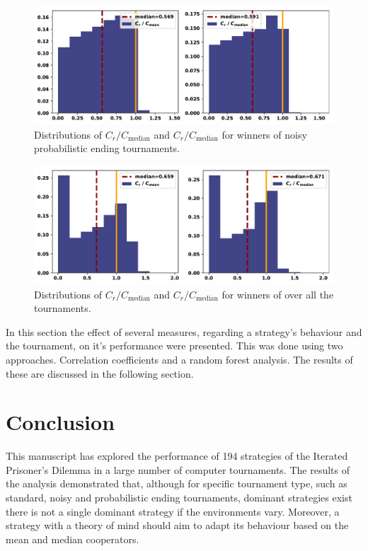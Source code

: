 \documentclass{article}
\begin{document}
\begin{figure}[!htbp]
    \centering
    \includegraphics[width=.5\textwidth]{../images/compared_to_mean_median_probend_noisy.pdf}
    \caption{Distributions of \(C_r / C_{\text{median}}\)
    and \(C_r / C_{\text{median}}\) for winners of noisy probabilistic ending tournaments.}\label{fig:mean_median_probend_noisy}
\end{figure}

\begin{figure}[!htbp]
    \centering
    \includegraphics[width=.5\textwidth]{../images/compared_to_mean_median_overall.pdf}
    \caption{Distributions of \(C_r / C_{\text{median}}\)
    and \(C_r / C_{\text{median}}\) for winners of over all the tournaments.}\label{fig:mean_median_overall}
\end{figure}

In this section the effect of several measures, regarding a strategy's behaviour
and the tournament, on it's performance were presented. This was done using
two approaches. Correlation coefficients and a random forest
analysis. The results of these are discussed in the following section.

\section{Conclusion}\label{section:conclusion}

This manuscript has explored the performance of 194 strategies of the Iterated
Prisoner's Dilemma in a large number of computer tournaments. The results of
the analysis demonstrated that, although for specific tournament type, such as
standard, noisy and probabilistic ending tournaments, dominant strategies exist
there is not a single dominant strategy if the environments
vary. Moreover, a strategy with a theory of mind should aim to adapt its behaviour
based on the mean and median cooperators.
\end{document}
